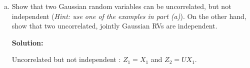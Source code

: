 \documentclass{article}
\newenvironment{solution}{\color{blue} \smallskip \textbf{Solution:}}{}
\begin{document}
\begin{enumerate}[(a)]
    \begin{solution}
        \begin{enumerate}[(i.)]
            \item $Z = \begin{bmatrix} 1 & 0 \\ 0 & 1 \end{bmatrix}X$, $\Sigma = \begin{bmatrix} 1 & 0 \\ 0 & 1 \end{bmatrix}$.
            \item $Z = \begin{bmatrix} 1 & 0 \\ 1 & 2 \end{bmatrix}X$, $\Sigma = \begin{bmatrix} 1 & 1 \\ 1 & 5 \end{bmatrix}$.
            \item $Z = \begin{bmatrix} 1 & 0 \\ -1 & 0 \end{bmatrix}X$, $\Sigma = \begin{bmatrix} 1 & -1 \\ -1 & 1 \end{bmatrix}$.
            \item $Z_1$, $Z_2$ are both marginally Gaussian. But $(Z_2 | Z_1 = z) = \begin{cases} z & \frac{1}{2} \\ -z & \frac{1}{2} \end{cases}$ is not a Gaussian distribution. $\Sigma = \begin{bmatrix} 1 & 0 \\ 0 & 1 \end{bmatrix}$.
            \[ \qedhere \]
        \end{enumerate}
    \end{solution}

    \item Show that two Gaussian random variables can be uncorrelated, but not independent (\textit{Hint: use one of the examples in part (a)}). On the other hand, show that two uncorrelated, jointly Gaussian RVs are independent. 

    \begin{solution}
        
        Uncorrelated but not independent : $Z_1 = X_1$ and $Z_2 = U X_1$.
        

\end{solution}
\end{enumerate}
\end{document}
